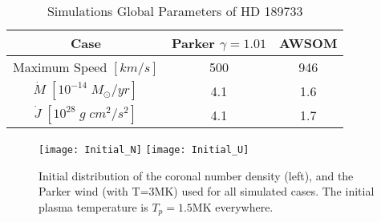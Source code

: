 \documentclass[apj]{emulateapj}
\begin{document}
\begin{table*}[h!]
\caption {Simulations Global Parameters of the Solar Corona} \label{tab:table1}
\label{table:t1}
\end{table*}

\begin{table*}[h!]
\caption {Simulations Global Parameters of HD 189733} \label{tab:table2}
\centering
\begin{tabular}{ccc}
\hline
{\bf Case}&{\bf Parker $\gamma=1.01$} & {\bf AWSOM} \\
\hline
Maximum Speed $[km/s]$&500&946\\
$\dot{M}\;[10^{-14}\;M_\odot/yr]$&4.1&1.6\\
$\dot{J}\;[10^{28}\;g\;cm^2/s^2]$&4.1&1.7\\
\hline
\end{tabular}
\label{table:t2}
\end{table*}





\begin{figure*}[h!]
\centering
\texttt{[image: Initial\_N]}
\texttt{[image: Initial\_U]}
\caption{Initial distribution of the coronal number density (left), and the Parker wind (with T=3MK) used for all simulated cases. The initial plasma temperature is $T_p=1.5$MK everywhere.}
\label{fig:f1}
\end{figure*}
\end{document}
